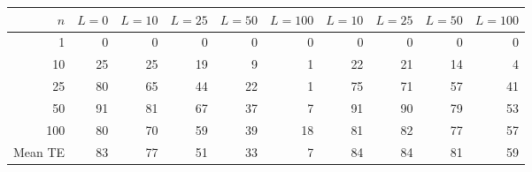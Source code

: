 \begin{tabular}{rrrrrrrrrr}
\toprule
$n$ & $L{=}0$ & $L{=}10$ & $L{=}25$ & $L{=}50$ & $L{=}100$ & $L{=}10$ & $L{=}25$ & $L{=}50$ & $L{=}100$ \\
\midrule
1 & 0 & 0 & 0 & 0 & 0 & 0 & 0 & 0 & 0 \\
10 & 25 & 25 & 19 & 9 & 1 & 22 & 21 & 14 & 4 \\
25 & 80 & 65 & 44 & 22 & 1 & 75 & 71 & 57 & 41 \\
50 & 91 & 81 & 67 & 37 & 7 & 91 & 90 & 79 & 53 \\
100 & 80 & 70 & 59 & 39 & 18 & 81 & 82 & 77 & 57 \\
Mean TE & 83 & 77 & 51 & 33 & 7 & 84 & 84 & 81 & 59 \\
\bottomrule
\end{tabular}
